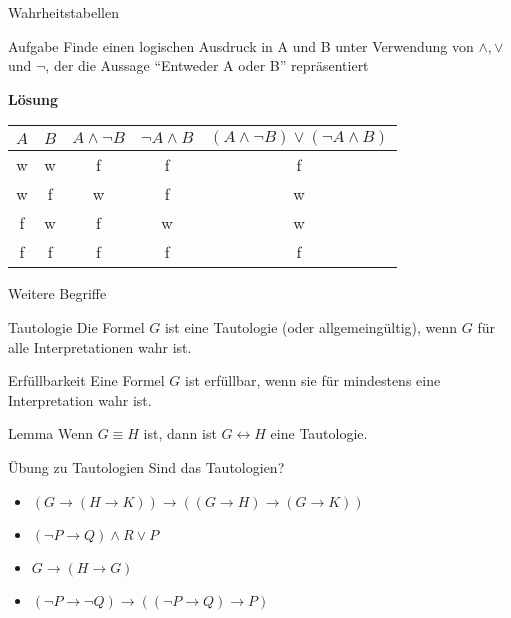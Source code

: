 \documentclass[]{beamer}
\begin{document}
\begin{frame}{Wahrheitstabellen}
	
	\begin{taskblock}{Aufgabe}
		Finde einen logischen Ausdruck in A und B unter Verwendung von $\land, \lor$ und $\lnot$, der die Aussage ``Entweder A oder B'' repräsentiert	
	\end{taskblock}
    \pause
	\textbf{Lösung}
	\begin{center}
		\begin{tabular}{|c|c|c|c|c|}
			\hline
			$A$&$B$& $A \land \lnot B$& $\lnot A \land B$ & $(A \land \lnot B) \lor (\lnot A \land B) $\\
			\hline
			w&w&f&f&f\\
			w&f&w&f&w\\
			f&w&f&w&w\\
			f&f&f&f&f\\
			\hline
		\end{tabular}
	\end{center}
\end{frame}


\begin{frame}{Weitere Begriffe}\pause
	\begin{block}{Tautologie}\pause
		Die Formel $G$ ist eine Tautologie (oder allgemeingültig)\pause , wenn $G$ für alle Interpretationen wahr ist.
	\end{block}\pause
	\begin{block}{Erfüllbarkeit}\pause
		Eine Formel $G$ ist erfüllbar\pause , wenn sie für mindestens eine Interpretation wahr ist.
	\end{block}
	\pause
	\begin{block}{Lemma}
		Wenn $G\equiv H$ ist, dann ist $G \leftrightarrow H$ eine Tautologie.
	\end{block}
\end{frame}

\begin{frame} {Übung zu Tautologien}
Sind das Tautologien?
\begin{itemize}
	\item $(G \rightarrow (H \rightarrow K)) \rightarrow ((G \rightarrow H) \rightarrow (G \rightarrow K))$ \pause \hspace{0.3cm} 
	\item $(\lnot P \rightarrow Q) \land R \lor P$ \pause \hspace{0.3cm} 
	\item $G \rightarrow (H \rightarrow G)$ \pause \hspace{0.3cm} 
	\item $(\lnot P \rightarrow \lnot Q) \rightarrow ((\lnot P \rightarrow Q) \rightarrow P)$ \pause \hspace{0.3cm} 
\end{itemize}
\end{frame}
\end{document}
